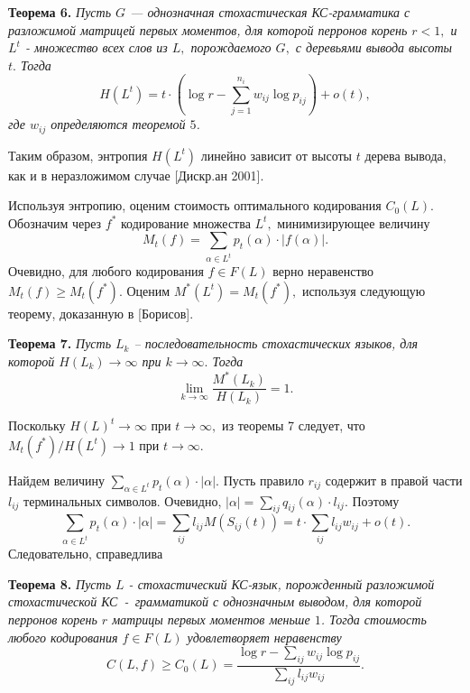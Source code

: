 \documentclass[12pt,russian]{article}
\begin{document}
{\medskip

\textbf {Теорема 6.}
{\em Пусть $G$ --- однозначная стохастическая КС-грамматика с разложимой
матрицей первых моментов, для которой перронов корень $r<1,$ и
$L^t$ - множество всех слов из $L,$ порождаемого $G,$ с деревьями вывода высоты $t.$ Тогда
$$
H(L^t) =t \cdot \left( \log r - \sum_{j=1}^{n_i} w_{ij}\log p_{ij}\right)+o(t),
$$
где $w_{ij}$ определяются теоремой $5$.
}

\medskip

Таким образом, энтропия $H(L^t)$ линейно зависит от высоты $t$ дерева вывода, как и в неразложимом случае [Дискр.ан 2001].

Используя энтропию, оценим стоимость оптимального кодирования $C_0(L).$
Обозначим через $f^*$ кодирование множества $L^t,$ минимизирующее величину 
$$
M_t(f)=\sum_{\alpha \in L^t} p_t(\alpha)\cdot \left|f(\alpha)\right|.
$$
Очевидно, для любого кодирования $f \in F(L)$ верно неравенство $M_t(f) \ge M_t(f^*).$ Оценим  $M^*(L^t)=M_t(f^*),$ используя следующую теорему, доказанную в [Борисов].

\medskip

\textbf {Теорема 7.}
{\em Пусть $L_k$ -- последовательность стохастических языков, для которой $H(L_k) \rightarrow \infty$ при $k \rightarrow \infty.$ Тогда 
$$
\lim_{k \rightarrow \infty} \frac{M^*(L_k)}{H(L_k)}=1.
$$ 
}
\medskip

Поскольку  $H(L)^t \rightarrow \infty$ при $t \rightarrow \infty,$ из теоремы 7 следует, что $M_t(f^*)/H(L^t) \rightarrow 1$ при $t \rightarrow \infty.$ 

Найдем величину $\sum_{ \alpha \in L^t} p_t(\alpha) \cdot | \alpha|.$ Пусть правило $r_{ij}$ содержит в правой части $l_{ij}$ терминальных символов. Очевидно, $\left|\alpha\right|=\sum_{ij} q_{ij}(\alpha)\cdot l_{ij}.$ Поэтому 
$$
\sum_{ \alpha \in L^t} p_t(\alpha) \cdot | \alpha|=\sum_{ij} l_{ij} M(S_{ij}(t))= t\cdot \sum_{ij} l_{ij} w_{ij} +o(t).
$$
Следовательно, справедлива

\medskip

{\bf Теорема 8.} 
{\em 
Пусть $L$ - стохастический КС-язык, порожденный разложимой стохастической КС~-~грамматикой с однозначным выводом, для которой перронов корень $r$ матрицы первых моментов меньше $1$. Тогда стоимость любого кодирования $f \in F(L)$ удовлетворяет неравенству
$$
C(L,f) \ge C_0(L)= \frac {\log r-\sum_{ij} w_{ij}\log p_{ij}}{\sum_{ij} l_{ij} w_{ij}}.
$$
}

\medskip
}
\end{document}
